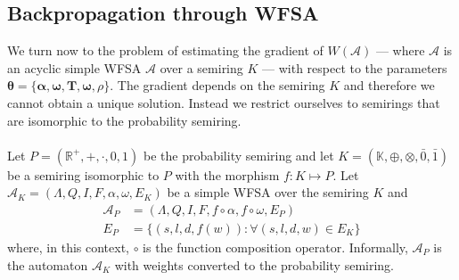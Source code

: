 \subsection{Backpropagation through WFSA}

We turn now to the problem of estimating the gradient of $W(\mathcal{A})$ --- where $\mathcal{A}$ is an acyclic simple WFSA $\mathcal{A}$ over a semiring $K$ --- with respect to the parameters $\boldsymbol{\theta} = \{ \boldsymbol{\alpha}, \boldsymbol{\omega},  \mathbf{T}, \boldsymbol{\omega}, \rho\}$. The gradient depends on the semiring $K$ and therefore we cannot obtain a unique solution. Instead we restrict ourselves to semirings that are isomorphic to the  probability semiring. 

\paragraph{} Let $P = (\mathbb{R}^+, +, \cdot, 0, 1)$ be the probability semiring and let $K = (\mathbb{K}, \oplus, \otimes, \bar{0}, \bar{1})$ be a semiring isomorphic to $P$ with the morphism $f : K \mapsto P$. Let $\mathcal{A}_K = (\Lambda, Q, I, F, \alpha, \omega, E_K)$ be a simple WFSA over the semiring $K$ and 
\begin{align}
    \mathcal{A}_P &= (\Lambda, Q, I, F, f \circ \alpha, f \circ \omega, E_P) \\
    E_P &= \{ (s, l, d, f(w)) : \forall (s, l, d, w) \in E_K\}
\end{align} 
where, in this context, $\circ$ is the function composition operator. Informally, $\mathcal{A}_P$ is the automaton $\mathcal{A}_K$ with weights converted to the probability semiring. 

